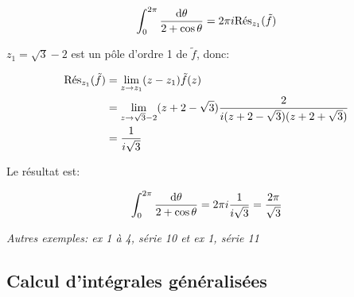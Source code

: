 \begin{enumerate}[label=\alph*)]
\begin{example}[2]
        \[ \int_0^{2\pi} \frac{\dth}{2 + \cos \theta} = 2\pi i \Res_{z_1} (\tilde{f}) \]
        
        $z_1 = \sqrt{3} - 2$ est un pôle d'ordre 1 de $\tilde{f}$, donc:
        
        \begin{align*}
        \Res_{z_1} (\tilde{f}) &= \lim_{z \rightarrow z_1} (z - z_1) \tilde{f}(z)
        \\&= \lim_{z \rightarrow \sqrt{3} - 2} (z + 2 - \sqrt{3}) \frac{2}{i(z + 2 - \sqrt{3})(z + 2 + \sqrt{3})}
        \\&= \frac{1}{i\sqrt{3}}
        \end{align*}
        
        Le résultat est:
        
        \[ \int_0^{2\pi} \frac{\dth}{2 + \cos \theta} = 2\pi i \frac{1}{i\sqrt{3}} = \frac{2\pi}{\sqrt{3}} \]
        
        \textit{Autres exemples: ex 1 à 4, série 10 et ex 1, série 11}
    \end{example}
\end{enumerate}

\subsection{Calcul d'intégrales généralisées}


